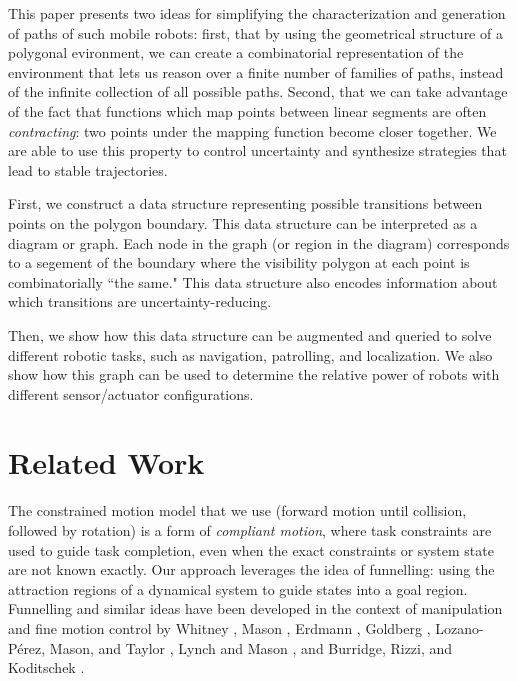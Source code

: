\documentclass[]{styles/svproc}  %
\begin{document}
This paper presents two ideas for simplifying the characterization and
generation of paths of such mobile robots: first, that by using the geometrical
structure of a polygonal evironment, we can create a combinatorial
representation of the environment that lets us reason over a finite number of
families of paths, instead of the infinite collection of all possible paths.
Second, that we can take advantage of the fact that functions which map points
between linear segments are often \emph{contracting}: two points under the
mapping function become closer together. We are able to use this property to
control uncertainty and synthesize strategies that lead to stable trajectories.

First, we construct a data structure representing possible transitions between points on
the polygon boundary. This data structure can be interpreted as a diagram or graph. 
Each node in the graph (or region in the diagram) corresponds to a segement of the
boundary where the visibility polygon at each point is combinatorially ``the
same." This data structure also encodes information about which transitions are 
uncertainty-reducing.

Then, we show how this data structure can be augmented and queried to solve different
robotic tasks, such as navigation, patrolling, and localization. We also show how this graph can be used to determine the
relative power of robots with different sensor/actuator configurations.




\section{Related Work}

The constrained motion model that we use (forward motion until collision,
followed by rotation) is a
form of \emph{compliant motion}, where task constraints are used to guide task
completion, even when the exact constraints or system state are not known
exactly. Our approach leverages the idea of funnelling: using
the attraction regions of a dynamical system to guide states into a goal region.
Funnelling and similar ideas have been developed in the context of manipulation and fine motion control by Whitney
\cite{Whi77}, Mason \cite{Mas85}, Erdmann
\cite{Erd86}, Goldberg \cite{Gol93}, Lozano-P{\'e}rez, Mason, and Taylor
\cite{LozMasTay84}, Lynch and Mason \cite{LynMas95}, and Burridge, Rizzi, and Koditschek \cite{BurRizKod99}.
\end{document}
